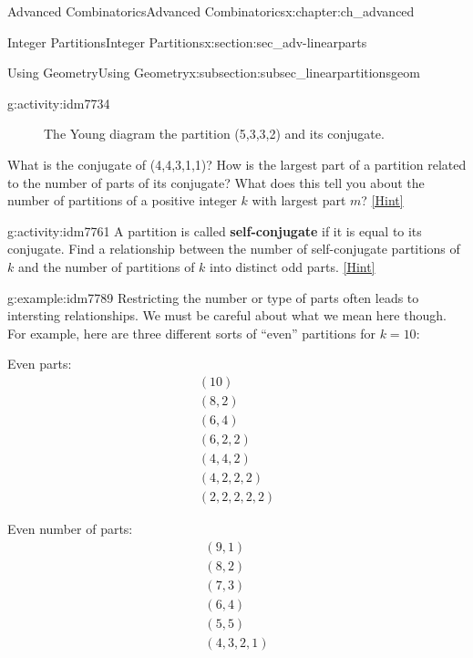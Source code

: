 \documentclass[oneside,10pt,]{book}
\newcommand{\terminology}[1]{\textbf{#1}}
\numberwithin{equation}{chapter}
\begin{document}
\begin{chapterptx}{Advanced Combinatorics}{}{Advanced Combinatorics}{}{}{x:chapter:ch_advanced}
\begin{sectionptx}{Integer Partitions}{}{Integer Partitions}{}{}{x:section:sec_adv-linearparts}
\begin{subsectionptx}{Using Geometry}{}{Using Geometry}{}{}{x:subsection:subsec_linearpartitionsgeom}
\begin{introduction}{}
\begin{activity}{}{g:activity:idm7734}
\begin{figure}
\caption{The Young diagram the partition (5,3,3,2) and its conjugate.\label{x:figure:conjugateYoung}}
\end{figure}
What is the conjugate of (4,4,3,1,1)? How is the largest part of a partition related to the number of parts of its conjugate? What does this tell you about the number of partitions of a positive integer \(k\) with largest part \(m\)?%
\space\hspace*{0pt}\hfill{\tiny\hyperlink{g:hint:idm7752-back}{[Hint]}}\end{activity}
\begin{activity}{}{g:activity:idm7761}%
A partition is called \terminology{self-conjugate} if it is equal to its conjugate. Find a relationship between the number of self-conjugate partitions of \(k\) and the number of partitions of \(k\) into distinct odd parts.%
\space\hspace*{0pt}\hfill{\tiny\hyperlink{g:hint:idm7772-back}{[Hint]}}\end{activity}
\begin{example}{}{g:example:idm7789}%
Restricting the number or type of parts often leads to intersting relationships.  We must be careful about what we mean here though.  For example, here are three different sorts of ``even'' partitions for \(k = 10\):%
\begin{sidebyside}{3}{0.0166666666666667}{0.0166666666666667}{0.0333333333333333}%
\begin{sbspanel}{0.3}%
Even parts:%
\begin{gather*}
(10) \\
(8, 2)\\
(6, 4)\\
(6, 2, 2)\\
(4,4,2)\\
(4,2,2,2)\\
(2,2,2,2,2)
\end{gather*}
%
\end{sbspanel}%
\begin{sbspanel}{0.3}%
\par
Even number of parts:%
\begin{gather*}
(9,1) \\
(8,2) \\
(7,3) \\
(6,4) \\
(5,5) \\
(4,3,2,1) 
\end{gather*}
%
\end{sbspanel}%

\end{sidebyside}
\end{example}
\end{introduction}
\end{subsectionptx}
\end{sectionptx}
\end{chapterptx}
\end{document}
